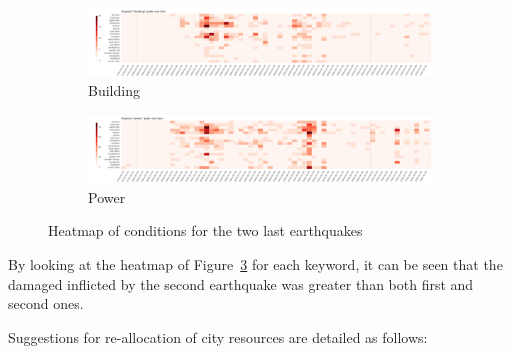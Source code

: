 \begin{figure}[!h]
\begin{subfigure}[!h]{0.96\textwidth}
        \includegraphics[width=1.00\textwidth]{figs/q2/build_2_3_heat.png}
        \caption{Building}
        \label{fig:building_2_3_heat}
    \end{subfigure}
    \begin{subfigure}[!h]{0.96\textwidth}
        \centering
        \includegraphics[width=1.00\textwidth]{figs/q2/power_2_3_heat.png}
        \caption{Power}
        \label{fig:power_2_3_heat}
    \end{subfigure}
    \caption{Heatmap of conditions for the two last earthquakes}
    \label{fig:eq_cond_2_3_heat}
\end{figure}

By looking at the heatmap of Figure~\ref{fig:eq_cond_2_3_heat} for each
keyword, it can be seen that the damaged inflicted by the
second earthquake was greater than both first and second ones.

Suggestions for re-allocation of city resources are detailed as follows:   

